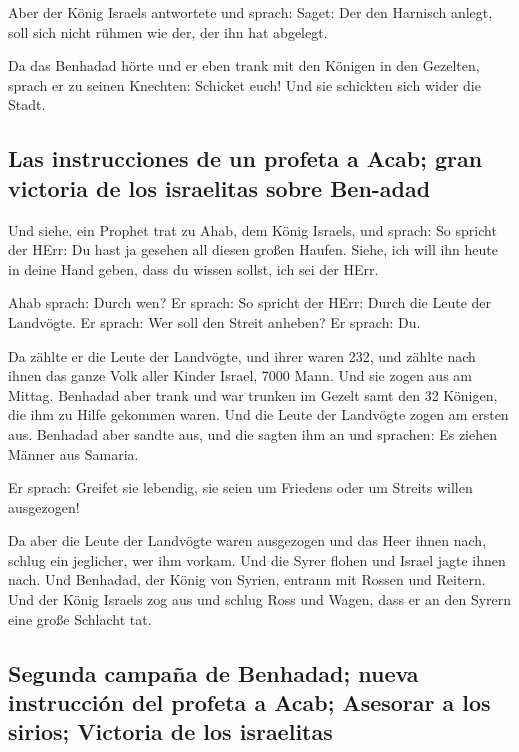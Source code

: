  Aber der König Israels antwortete und sprach: Saget: Der
den Harnisch anlegt, soll sich nicht rühmen wie der, der ihn hat
abgelegt.

 Da das Benhadad hörte und er eben trank mit den Königen
in den Gezelten, sprach er zu seinen Knechten: Schicket euch! Und sie
schickten sich wider die Stadt.

\hypertarget{las-instrucciones-de-un-profeta-a-acab-gran-victoria-de-los-israelitas-sobre-ben-adad}{%
\subsection{Las instrucciones de un profeta a Acab; gran victoria de los
israelitas sobre
Ben-adad}\label{las-instrucciones-de-un-profeta-a-acab-gran-victoria-de-los-israelitas-sobre-ben-adad}}

 Und siehe, ein Prophet trat zu Ahab, dem König Israels,
und sprach: So spricht der HErr: Du hast ja gesehen all diesen großen
Haufen. Siehe, ich will ihn heute in deine Hand geben, dass du wissen
sollst, ich sei der HErr.

 Ahab sprach: Durch wen? Er sprach: So spricht der HErr:
Durch die Leute der Landvögte. Er sprach: Wer soll den Streit anheben?
Er sprach: Du.

 Da zählte er die Leute der Landvögte, und ihrer waren
232, und zählte nach ihnen das ganze Volk aller Kinder Israel, 7000
Mann.  Und sie zogen aus am Mittag. Benhadad aber trank
und war trunken im Gezelt samt den 32 Königen, die ihm zu Hilfe gekommen
waren.  Und die Leute der Landvögte zogen am ersten aus.
Benhadad aber sandte aus, und die sagten ihm an und sprachen: Es ziehen
Männer aus Samaria.

 Er sprach: Greifet sie lebendig, sie seien um Friedens
oder um Streits willen ausgezogen!

 Da aber die Leute der Landvögte waren ausgezogen und das
Heer ihnen nach,  schlug ein jeglicher, wer ihm vorkam.
Und die Syrer flohen und Israel jagte ihnen nach. Und Benhadad, der
König von Syrien, entrann mit Rossen und Reitern.  Und
der König Israels zog aus und schlug Ross und Wagen, dass er an den
Syrern eine große Schlacht tat.

\hypertarget{segunda-campauxf1a-de-benhadad-nueva-instrucciuxf3n-del-profeta-a-acab-asesorar-a-los-sirios-victoria-de-los-israelitas}{%
\subsection{Segunda campaña de Benhadad; nueva instrucción del profeta a
Acab; Asesorar a los sirios; Victoria de los
israelitas}\label{segunda-campauxf1a-de-benhadad-nueva-instrucciuxf3n-del-profeta-a-acab-asesorar-a-los-sirios-victoria-de-los-israelitas}}


